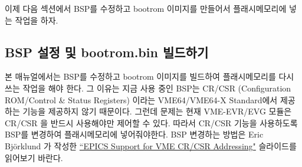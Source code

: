 \documentclass[11pt,a4paper]{article}
\begin{document}
이제 다음 섹션에서 BSP를 수정하고 bootrom 이미지를 만들어서 플래시메모리에 넣는 작업을 하자.

\subsection{BSP 설정 및 bootrom.bin 빌드하기}

본 매뉴얼에서는 BSP를 수정하고 bootrom 이미지를 빌드하여 플래시메모리를 다시 쓰는 작업을 해야 한다.
그 이유는 지금 사용 중인 BSP는 CR/CSR (Configuration ROM/Control \& Status Registers) 이라는 VME64/VME64-X Standard에서 
제공하는 기능을 제공하지 않기 때문이다. 그런데 문제는 현재 VME-EVR/EVG 모듈은 CR/CSR 을 반드시 사용해야만 제어할 수 있다.
따라서 CR/CSR 기능을 사용하도록 BSP를 변경하여 플래시메모리에 넣어줘야한다. BSP 변경하는 방법은 Eric Björklund 가 작성한 
 \href{https://www.google.co.kr/url?sa=t&rct=j&q=&esrc=s&source=web&cd=3&ved=0CEQQFjAC&url=http%3A%2F%2Fwww.aps.anl.gov%2Fepics%2Fmeetings%2F2006-06%2FRecDevDrv_Support%2FSupport_for_CR-CSR_Addressing.ppt&ei=e_9wU7GUCYj28QW99YCAAg&usg=AFQjCNEOPRpoVT1VXbYzLB-7jMgkm237ow&sig2=knwLs7FrKXkNWzK0yJrAXQ&bvm=bv.66330100,d.dGI&cad=rjt}{``EPICS Support for VME CR/CSR Addressing"} 
슬라이드를 읽어보기 바란다. \\
\end{document}
